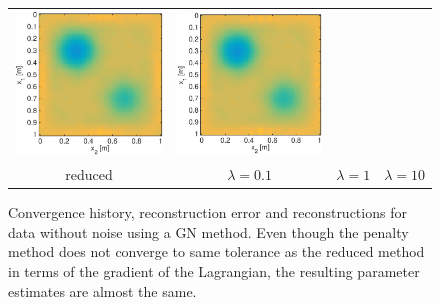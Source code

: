 \documentclass{iopart}
\begin{document}
\begin{figure}
\begin{tabular}{cccc}
\includegraphics[scale=.2]{./figs/2D_exp1_h}&
\includegraphics[scale=.2]{./figs/2D_exp1_i}\\
{\small reduced}&{\small $\lambda=0.1$}&{\small $\lambda=1$}&{\small $\lambda=10$}\\
\end{tabular}
\caption{Convergence history, reconstruction error and reconstructions for data without noise using a GN method. Even though the penalty method does not converge to same tolerance as the reduced method in terms of the gradient of the Lagrangian, the resulting parameter estimates are almost the same.}
\label{fig:2D_exp1}
\end{figure}
\end{document}
